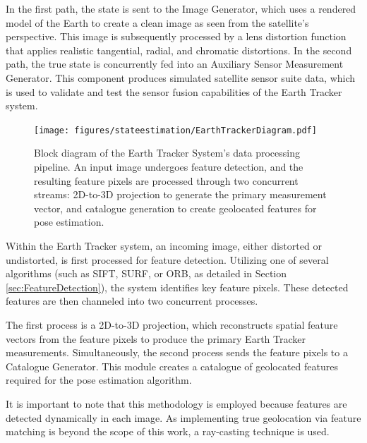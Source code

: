 \noindent
In the first path, the state is sent to the Image Generator, which uses a rendered model of the Earth to create a clean image as seen from the satellite's perspective. 
This image is subsequently processed by a lens distortion function that applies realistic tangential, radial, and chromatic distortions. In the second path, the true state is 
concurrently fed into an Auxiliary Sensor Measurement Generator. This component produces simulated satellite sensor suite data, which is used to validate and test the sensor fusion capabilities 
of the Earth Tracker system.


\begin{figure}[H]
    \centering
    \texttt{[image: figures/stateestimation/EarthTrackerDiagram.pdf]}
    \caption{Block diagram of the Earth Tracker System's data processing pipeline. An input image undergoes feature detection, and the resulting feature pixels are 
    processed through two concurrent streams: 2D-to-3D projection to generate the primary measurement vector, and catalogue generation to create geolocated features for 
    pose estimation.}
    \label{fig:ETDiagram}
\end{figure}

\noindent
Within the Earth Tracker system, an incoming image, either distorted or undistorted, is first processed for feature detection. Utilizing one of several algorithms (such as SIFT, SURF, or ORB, as 
detailed in Section \ref{sec:FeatureDetection}), the system identifies key feature pixels. These detected features are then channeled into two concurrent processes.
\vspace{0.5cm}

\noindent
The first process is a 2D-to-3D projection, which reconstructs spatial feature vectors from the feature pixels to produce the primary Earth Tracker measurements. Simultaneously, 
the second process sends the feature pixels to a Catalogue Generator. This module creates a catalogue of geolocated features required for the pose estimation algorithm.
\vspace{0.5cm}

\noindent
It is important to note that this methodology is employed because features are detected dynamically in each image. As implementing true geolocation via feature matching is beyond the 
scope of this work, a ray-casting technique is used.

